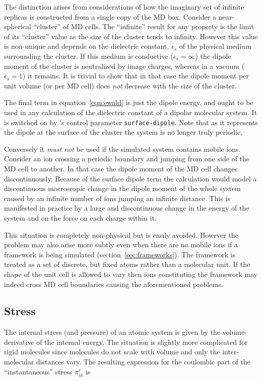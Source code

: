 The distinction arises from considerations of how the imaginary set of
infinite replicas is constructed from a single copy of the MD 
box\cite[pp 156-159]{allen:87}.  Consider a near-spherical ``cluster''
of MD cells.  The ``infinite'' result for any property is the limit of
its ``cluster'' value as the size of the cluster tends to infinity.
However this value is non-unique and depends on the dielectric
constant, $\epsilon_s$ of the physical medium surrounding the cluster.
If this medium is conductive ($\epsilon_s=\infty$) the dipole
moment of the cluster is neutralized by image charges, whereas in a
vacuum ($\epsilon_s=1$) it remains.  It is trivial to show that
in that case the dipole moment per unit volume (or per MD cell) does
{\em not\/} decrease with the size of the cluster.

The final term in equation~\ref{eqn:ewald} is just the dipole energy,
and ought to be used in any calculation of the dielectric constant of
a dipolar molecular system.  It is switched on by \moldy's control
parameter \verb+surface-dipole+.  Note that as it represents the
dipole at the surface of the cluster the system is no longer truly
periodic.

Conversely it {\em must not\/} be used if the simulated system contains
mobile ions.  Consider an ion crossing a periodic boundary and jumping
from one side of the MD cell to another.  In that case the dipole
moment of the MD cell changes discontinuously.   Because of the
surface dipole term the calculation would model a discontinuous
macroscopic change in the dipole moment of the whole system caused by
an infinite number of ions jumping an infinite distance.  This is
manifested in practice by a large and discontinuous change in the
energy of the system and on the force on each charge within it.

This situation is completely non-physical but is easily avoided.
However the problem may also arise more subtly even when there are no
mobile ions if a framework is being simulated
(section~\ref{sec:frameworks}).  The framework is treated as a set of
discrete, but fixed atoms rather than a molecular unit.  If the shape
of the unit cell is allowed to vary then ions constituting the
framework may indeed cross MD cell boundaries causing the
aforementioned problems.

\subsection{Stress}

The internal stress (and pressure) of an atomic system is given by the
volume-derivative of the internal energy.  The situation is slightly
more complicated for rigid molecules since molecules do not scale with
volume and only the inter-molecular distances vary.  The resulting
expression for the coulombic part of the ``instantaneous'' stress
$\pi_{ik}^e$ is\cite[Appendix A]{nose:83}

